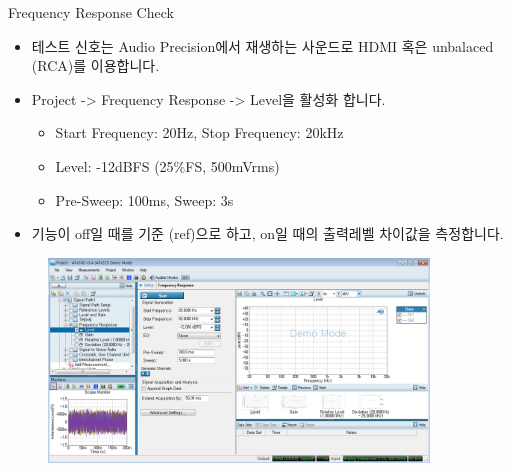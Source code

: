 \documentclass{beamer}
\begin{document}
\begin{frame}[t]{Frequency Response Check}
\begin{itemize}
\item 테스트 신호는 Audio Precision에서 재생하는 사운드로 HDMI 혹은 unbalaced (RCA)를 이용합니다.
\item Project -> Frequency Response -> Level을 활성화 합니다.
	\begin{itemize}
	\item Start Frequency: 20Hz, Stop Frequency: 20kHz
	\item Level: -12dBFS (25\%FS, 500mVrms)
	\item Pre-Sweep: 100ms, Sweep: 3s
	\end{itemize}
\item 기능이 off일 때를 기준 (ref)으로 하고, on일 때의 출력레벨 차이값을 측정합니다.
\end{itemize}

\begin{figure}[b]
\includegraphics[width=0.9\textwidth]{figure/apsetting/frequencyResponse.png}
\end{figure}

\end{frame}
\end{document}
